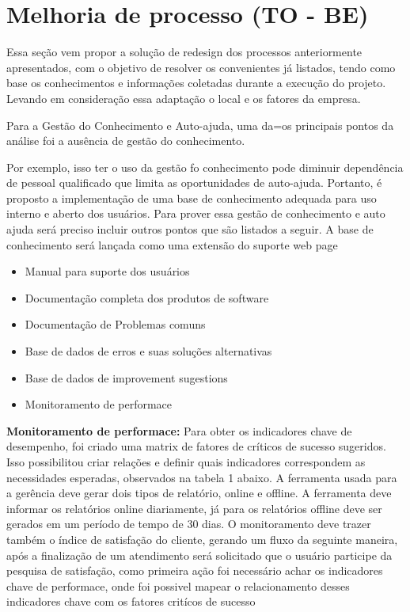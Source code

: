 \section{ Melhoria de processo (TO - BE)}

Essa seção vem  propor a solução de redesign  dos processos
anteriormente apresentados, com o objetivo de resolver os convenientes
já listados, tendo como base os conhecimentos e informações coletadas
durante a execução do projeto. Levando em consideração essa adaptação o
local e os fatores da empresa.

Para a Gestão do Conhecimento e Auto-ajuda, uma da=os principais pontos da
análise foi a ausência de gestão do conhecimento.

Por exemplo, isso ter o uso da gestão fo conhecimento pode diminuir dependência de
pessoal qualificado que limita as oportunidades de auto-ajuda.
Portanto, é proposto a implementação de  uma base de conhecimento adequada
para uso interno e aberto dos usuários. Para prover essa gestão de conhecimento
e auto ajuda será preciso incluir outros pontos que são listados a seguir.
A base de conhecimento será lançada como uma extensão do suporte web page


\begin{itemize}[noitemsep]

		\item Manual para suporte dos usuários
		\item Documentação completa dos produtos de software
		\item Documentação de Problemas comuns
		\item Base de dados de erros e suas soluções alternativas
		\item Base de dados de improvement sugestions
		\item Monitoramento de performace \\

\end{itemize}

 \textbf{Monitoramento de performace:}
Para obter os indicadores chave de desempenho, foi criado uma
matrix de fatores de críticos de sucesso sugeridos.
Isso possibilitou criar relações e definir quais indicadores
correspondem as necessidades esperadas, observados na tabela 1 abaixo.
	A ferramenta usada para a gerência deve gerar dois tipos de relatório, online
	e offline. A ferramenta deve informar os relatórios online diariamente, já
	para os relatórios offline deve ser gerados em um período de tempo de 30 dias.
	O monitoramento deve trazer também o índice de satisfação do cliente,
	gerando um fluxo da seguinte maneira, após a finalização de um atendimento
	será solicitado que o usuário participe da pesquisa de satisfação, como
	primeira ação foi necessário achar os indicadores chave de performace,
	onde foi possivel mapear o relacionamento desses indicadores chave com os fatores
	critícos de sucesso

